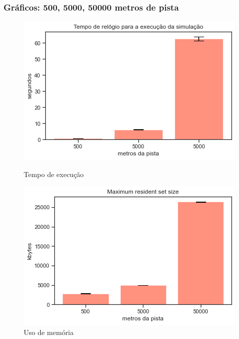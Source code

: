 \documentclass{beamer}
\begin{document}
\begin{frame}
\frametitle{Gráficos: 500, 5000, 50000 metros de pista}


\begin{figure}[!htb]
  \includegraphics[width=\linewidth]{imgs/pistas_tempo}
  \caption{Tempo de execução}\label{fig:awesome_image1}
\endminipage\hfill
{}
  \includegraphics[width=\linewidth]{imgs/pistas_memoria}
  \caption{Uso de memória}\label{fig:awesome_image2}
  \endminipage\hfill
\end{figure}

\end{frame}
\end{document}

